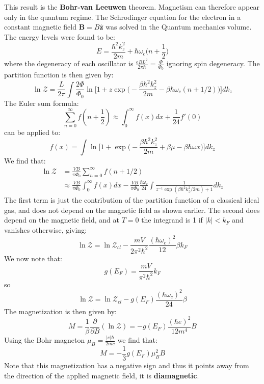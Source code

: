 \documentclass[a4paper,11pt,oneside]{book}
\begin{document}
This result is the \textbf{Bohr-van Leeuwen} theorem. Magnetism can therefore appear only in the quantum regime. The Schrodinger equation for the electron in a constant magnetic field $\textbf{B} = B \hat{\textbf{z}}$ was solved in the Quantum mechanics volume. The energy levels were found to be:
\begin{equation}
    E = \frac{\hbar^2 k_z^2}{2m} + \hbar \omega_c\bigg(n+\frac{1}{2}\bigg)
\end{equation}
where the degeneracy of each oscillator is $\frac{eBL^2}{2\pi \hbar} = \frac{\Phi}{\Phi_0}$ ignoring spin degeneracy. The partition function is then given by:
\begin{equation}
    \ln \mathcal{Z} = \frac{L}{2\pi}\int \frac{2\Phi}{\Phi_0} \ln \bigg[1+z\exp\bigg(-\frac{\beta \hbar^2 k_z^2}{2m}-\beta \hbar \omega_c(n+1/2)\bigg)\bigg]dk_z
\end{equation}
The Euler sum formula:
\begin{equation}
    \sum_{n=0}^\infty f(n+\frac{1}{2}) \approx \int_0^\infty f(x)dx + \frac{1}{24}f'(0)
\end{equation}
can be applied to:
\begin{equation}
    f(x) = \int  \ln \bigg[1+\exp\bigg(-\frac{\beta \hbar^2 k_z^2}{2m}+\beta\mu - \beta\hbar \omega x\bigg)\bigg]dk_z
\end{equation}
We find that:
\begin{align}
    \ln \mathcal{Z} &= \frac{VB}{\pi \Phi_0}\sum_{n=0}^\infty f(n+1/2)\\
    &\approx \frac{VB}{\pi \Phi_0} \int_0^\infty f(x)dx - \frac{VB}{\pi \Phi_0} \frac{\hbar \omega_c}{24}\int \frac{1}{z^{-1}\exp(\beta \hbar^2 k_z^2/2m)+1} dk_z
\end{align}
The first term is just the contribution of the partition function of a classical ideal gas, and does not depend on the magnetic field as shown earlier. The second does depend on the magnetic field, and at $T=0$ the integrand is 1 if $|k|<k_F$ and vanishes otherwise, giving:
\begin{equation}
      \ln \mathcal{Z} =\ln \mathcal{Z}_{cl} - \frac{mV}{2\pi^2\hbar^2} \frac{(\hbar \omega_c)^2}{12}\beta k_F
\end{equation}
We now note that:
\begin{equation}
    g(E_F) = \frac{mV}{\pi^2 \hbar^2} k_F
\end{equation}
so
\begin{equation}
     \ln \mathcal{Z} =\ln \mathcal{Z}_{cl} - g(E_F) \frac{(\hbar \omega_c)^2}{24}\beta
\end{equation}
The magnetization is then given by:
\begin{equation}
    M = \frac{1}{\beta} \frac{\partial}{\partial B}(\ln \mathcal{Z}) = - g(E_F) \frac{(\hbar e)^2}{12m^4}B
\end{equation}
Using the Bohr magneton $\mu_B = \frac{|e|\hbar}{2mc}$ we find that:
\begin{equation}
    M =- \frac{1}{3}g(E_F)\mu_B^2 B
\end{equation}
Note that this magnetization has a negative sign and thus it points away from the direction of the applied magnetic field, it is \textbf{diamagnetic}.
\end{document}
